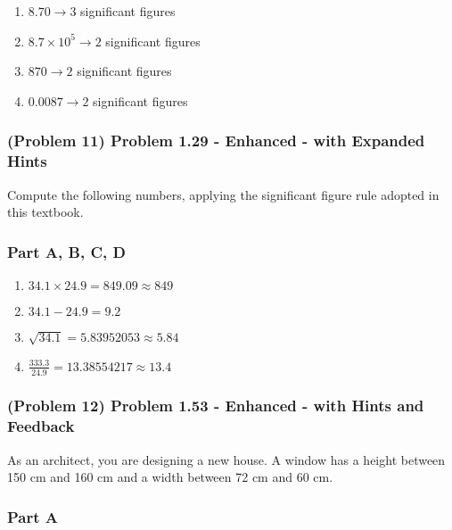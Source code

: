 \vspace{1em}

\begin{solution}
	\begin{enumerate}[label=\Alph*.]
		\item $8.70 \to 3$ significant figures
		\item $8.7 \times 10^{5} \to 2$ significant figures
		\item $870 \to 2$ significant figures
		\item $0.0087 \to 2$ significant figures
	\end{enumerate}
\end{solution}

\subsubsection{(Problem 11) Problem 1.29 - Enhanced - with Expanded Hints}

Compute the following numbers, applying the significant figure rule adopted in this textbook.

\subsubsection{Part A, B, C, D}

\begin{solution}
	\begin{enumerate}[label=\Alph*.]
		\item $34.1 \times 24.9 = 849.09 \approx 849$
		\item $34.1 - 24.9 = 9.2$
		\item $\sqrt{34.1} = 5.83952053 \approx 5.84$
		\item $\frac{333.3}{24.9} = 13.38554217 \approx 13.4$
	\end{enumerate}
\end{solution}

\newpage

\subsubsection{(Problem 12) Problem 1.53 - Enhanced - with Hints and Feedback}

As an architect, you are designing a new house. A window has a height between 150 cm and 160 cm and a width between 72 cm and 60 cm.

\subsubsection{Part A}

